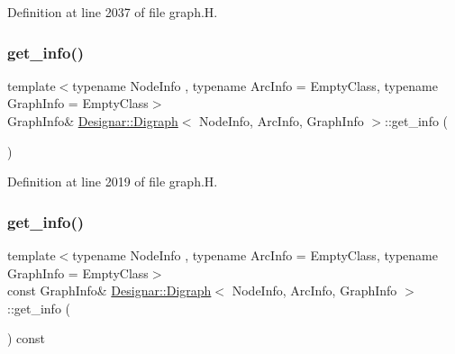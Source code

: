 Definition at line 2037 of file graph.\+H.

\mbox{\label{class_designar_1_1_digraph_a530d2befede0eede246d9eed6c05f1f6}} 
\subsubsection{\texorpdfstring{get\+\_\+info()}{get\_info()}\hspace{0.1cm}{\footnotesize\ttfamily [1/2]}}
{\footnotesize\ttfamily template$<$typename Node\+Info , typename Arc\+Info  = Empty\+Class, typename Graph\+Info  = Empty\+Class$>$ \\
Graph\+Info\& \hyperlink{class_designar_1_1_digraph}{Designar\+::\+Digraph}$<$ Node\+Info, Arc\+Info, Graph\+Info $>$\+::get\+\_\+info (\begin{DoxyParamCaption}{ }\end{DoxyParamCaption})\hspace{0.3cm}{\ttfamily [inline]}}



Definition at line 2019 of file graph.\+H.

\mbox{\label{class_designar_1_1_digraph_a113a9f5a392795312a2d0c0d5c86041c}} 
\subsubsection{\texorpdfstring{get\+\_\+info()}{get\_info()}\hspace{0.1cm}{\footnotesize\ttfamily [2/2]}}
{\footnotesize\ttfamily template$<$typename Node\+Info , typename Arc\+Info  = Empty\+Class, typename Graph\+Info  = Empty\+Class$>$ \\
const Graph\+Info\& \hyperlink{class_designar_1_1_digraph}{Designar\+::\+Digraph}$<$ Node\+Info, Arc\+Info, Graph\+Info $>$\+::get\+\_\+info (\begin{DoxyParamCaption}{ }\end{DoxyParamCaption}) const\hspace{0.3cm}{\ttfamily [inline]}}



